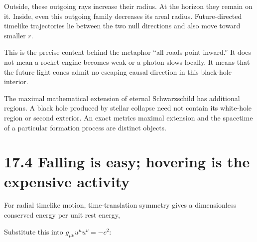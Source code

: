 \documentclass[
  11pt,
  letterpaper,
  oneside,
  openany]{scrbook}
\begin{document}
\begin{center}
\begingroup
{}
\ifdim\wd\grmathbox>\linewidth
\resizebox{\linewidth}{!}{\usebox{\grmathbox}}
\else\usebox{\grmathbox}\fi
\endgroup
\end{center}

Outside, these outgoing rays increase their radius. At the horizon they
remain on it. Inside, even this outgoing family decreases its areal
radius. Future-directed timelike trajectories lie between the two null
directions and also move toward smaller \(r\).

This is the precise content behind the metaphor ``all roads point
inward.'' It does not mean a rocket engine becomes weak or a photon
slows locally. It means that the future light cones admit no escaping
causal direction in this black-hole interior.

The maximal mathematical extension of eternal Schwarzschild has
additional regions. A black hole produced by stellar collapse need not
contain its white-hole region or second exterior. An exact
metric\textquotesingle s maximal extension and the spacetime of a
particular formation process are distinct objects.

\hypertarget{falling-is-easy-hovering-is-the-expensive-activity}{%
\section{17.4 Falling is easy; hovering is the expensive
activity}\label{falling-is-easy-hovering-is-the-expensive-activity}}

For radial timelike motion, time-translation symmetry gives a
dimensionless conserved energy per unit rest energy,

\begin{center}
\begingroup
{}
\ifdim\wd\grmathbox>\linewidth
\resizebox{\linewidth}{!}{\usebox{\grmathbox}}
\else\usebox{\grmathbox}\fi
\endgroup
\end{center}

Substitute this into \(g_{\mu\nu}u^\mu u^\nu=-c^2\):

\begin{center}
\begingroup
{}
\ifdim\wd\grmathbox>\linewidth
\resizebox{\linewidth}{!}{\usebox{\grmathbox}}
\else\usebox{\grmathbox}\fi
\endgroup
\end{center}
\end{document}
